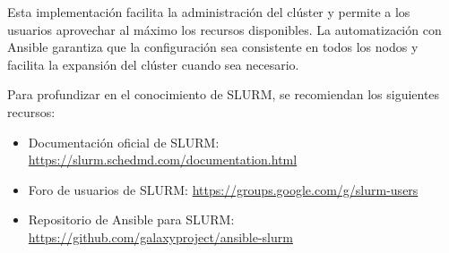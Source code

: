 \documentclass[12pt,a4paper]{article}
\begin{document}
Esta implementación facilita la administración del clúster y permite a los usuarios aprovechar al máximo los recursos disponibles. La automatización con Ansible garantiza que la configuración sea consistente en todos los nodos y facilita la expansión del clúster cuando sea necesario.

\begin{infobox}
Para profundizar en el conocimiento de SLURM, se recomiendan los siguientes recursos:
\begin{itemize}
    \item Documentación oficial de SLURM: \url{https://slurm.schedmd.com/documentation.html}
    \item Foro de usuarios de SLURM: \url{https://groups.google.com/g/slurm-users}
    \item Repositorio de Ansible para SLURM: \url{https://github.com/galaxyproject/ansible-slurm}
\end{itemize}
\end{infobox}
\end{document}
